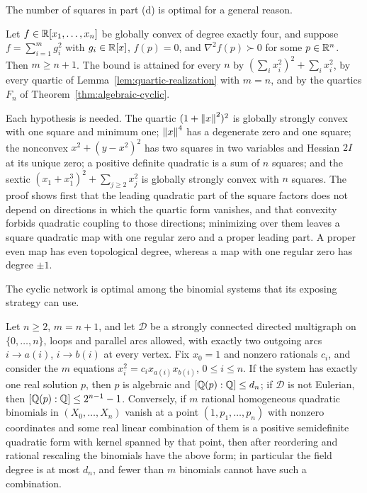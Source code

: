The number of squares in part (d) is optimal for a general reason.

\begin{theorem}
\label{thm:sos-length}
Let $f\in\mathbb R[x_1,\ldots,x_n]$ be globally convex of degree exactly four, and
suppose $f=\sum_{i=1}^mg_i^2$ with $g_i\in\mathbb R[x]$, $f(p)=0$, and
$\nabla^2f(p)\succ0$ for some $p\in\mathbb R^n$. Then $m\ge n+1$. The bound is
attained for every $n$ by $(\sum_ix_i^2)^2+\sum_ix_i^2$, by every quartic of
Lemma~\ref{lem:quartic-realization} with $m=n$, and by the quartics $F_n$ of
Theorem~\ref{thm:algebraic-cyclic}.
\end{theorem}

Each hypothesis is needed. The quartic $(1+\left\lVert x\right\rVert^2)^2$ is globally strongly
convex with one square and minimum one; $\left\lVert x\right\rVert^4$ has a degenerate zero and
one square; the nonconvex $x^2+(y-x^2)^2$ has two squares in two variables and
Hessian $2I$ at its unique zero; a positive definite quadratic is a sum of $n$
squares; and the sextic $(x_1+x_1^3)^2+\sum_{j\ge2}x_j^2$ is globally strongly
convex with $n$ squares. The proof shows first that the leading quadratic part
of the square factors does not depend on directions in which the quartic form
vanishes, and that convexity forbids quadratic coupling to those directions;
minimizing over them leaves a square quadratic map with one regular zero and a
proper leading part. A proper even map has even topological degree, whereas a
map with one regular zero has degree $\pm1$.

The cyclic network is optimal among the binomial systems that its exposing
strategy can use.

\begin{proposition}
\label{prop:algebraic-network}
Let $n\ge2$, $m=n+1$, and let $\mathcal D$ be a strongly connected directed
multigraph on $\{0,\ldots,n\}$, loops and parallel arcs allowed, with exactly
two outgoing arcs $i\to a(i)$, $i\to b(i)$ at every vertex. Fix $x_0=1$ and
nonzero rationals $c_i$, and consider the $m$ equations
$x_i^2=c_ix_{a(i)}x_{b(i)}$, $0\le i\le n$. If the system has exactly one real
solution $p$, then $p$ is algebraic and $[\mathbb Q(p):\mathbb Q]\le d_n$; if $\mathcal D$
is not Eulerian, then $[\mathbb Q(p):\mathbb Q]\le2^{n-1}-1$. Conversely, if $m$ rational
homogeneous quadratic binomials in $(X_0,\ldots,X_n)$ vanish at a point
$(1,p_1,\ldots,p_n)$ with nonzero coordinates and some real linear
combination of them is a positive semidefinite quadratic form with kernel
spanned by that point, then after reordering and rational rescaling the
binomials have the above form; in particular the field degree is at most $d_n$,
and fewer than $m$ binomials cannot have such a combination.
\end{proposition}

